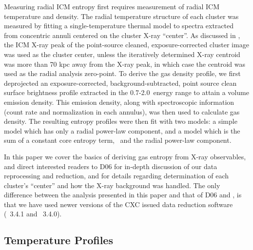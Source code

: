 \documentclass[apj]{emulateapj}
\begin{document}
Measuring radial ICM entropy first requires measurement of radial ICM
temperature and density. The radial temperature structure of each
cluster was measured by fitting a single-temperature thermal model to
spectra extracted from concentric annuli centered on the cluster X-ray
``center''. As discussed in \citet{xrayband}, the ICM X-ray peak of
the point-source cleaned, exposure-corrected cluster image was used as
the cluster center, unless the iteratively determined X-ray centroid
was more than 70 kpc away from the X-ray peak, in which case the
centroid was used as the radial analysis zero-point. To derive the gas
density profile, we first deprojected an exposure-corrected,
background-subtracted, point source clean surface brightness profile
extracted in the 0.7-2.0\keV\ energy range to attain a volume emission
density. This emission density, along with spectroscopic information
(count rate and normalization in each annulus), was then used to
calculate gas density. The resulting entropy profiles were then fit
with two models: a simple model which has only a radial power-law
component, and a model which is the sum of a constant core entropy
term, \kna\, and the radial power-law component.

In this paper we cover the basics of deriving gas entropy from X-ray
observables, and direct interested readers to D06 for in-depth
discussion of our data reprocessing and reduction, and
\citet{xrayband} for details regarding determination of each cluster's
``center'' and how the X-ray background was handled. The only
difference between the analysis presented in this paper and that of
D06 and \citet{xrayband}, is that we have used newer versions of the
CXC issued data reduction software (\ciao\ 3.4.1 and \caldb\ 3.4.0).

\subsection{Temperature Profiles}
\label{sec:temppr}
\end{document}
